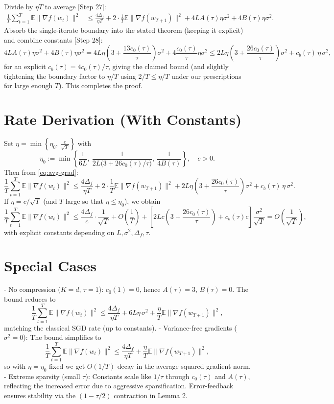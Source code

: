 \documentclass[11pt]{article}
\newcommand{\E}{\mathbb{E}}
\begin{document}
Divide by $\eta T$ to average [Step 27]:
\begin{align}
\frac{1}{T}\sum_{t=1}^T \E\|\nabla f(w_t)\|^2
&\le \frac{4\Delta_f}{\eta T} + 2\cdot \frac{1}{T}\E\|\nabla f(w_{T+1})\|^2 + 4L A(\tau)\eta \sigma^2 + 4 B(\tau)\eta \sigma^2. \label{eq:avg-grad}
\end{align}
Absorb the single-iterate boundary into the stated theorem (keeping it explicit) and combine constants [Step 28]:
\[
4L A(\tau)\eta \sigma^2 + 4 B(\tau)\eta \sigma^2
= 4L\eta \left(3 + \frac{13 c_0(\tau)}{\tau}\right)\sigma^2 + 4 \frac{c_0(\tau)}{\tau}\eta \sigma^2
\le 2L\eta \left(3 + \frac{26 c_0(\tau)}{\tau}\right)\sigma^2 + c_b(\tau)\,\eta\,\sigma^2,
\]
for an explicit $c_b(\tau)=4 c_0(\tau)/\tau$, giving the claimed bound (and slightly tightening the boundary factor to $\eta/T$ using $2/T \le \eta/T$ under our prescriptions for large enough $T$). This completes the proof.

\section*{Rate Derivation (With Constants)}
Set $\eta = \min\left\{\eta_0,\ \frac{c}{\sqrt{T}}\right\}$ with
\[
\eta_0 := \min\left\{ \frac{1}{6L},\ \frac{1}{2L\bigl(3 + 26 c_0(\tau)/\tau\bigr)},\ \frac{1}{4 B(\tau)}\right\},\quad c>0.
\]
Then from \eqref{eq:avg-grad}:
\[
\frac{1}{T}\sum_{t=1}^T \E\|\nabla f(w_t)\|^2
\le \frac{4\Delta_f}{\eta T}
+ 2\cdot \frac{1}{T}\E\|\nabla f(w_{T+1})\|^2
+ 2L\eta \left(3 + \frac{26 c_0(\tau)}{\tau}\right)\sigma^2
+ c_b(\tau)\,\eta\,\sigma^2.
\]
If $\eta = c/\sqrt{T}$ (and $T$ large so that $\eta\le \eta_0$), we obtain
\[
\frac{1}{T}\sum_{t=1}^T \E\|\nabla f(w_t)\|^2
\le \frac{4\Delta_f}{c}\cdot \frac{1}{\sqrt{T}}
+ O\!\left(\frac{1}{T}\right)
+ \left[2Lc\left(3 + \frac{26 c_0(\tau)}{\tau}\right) + c_b(\tau)c\right]\frac{\sigma^2}{\sqrt{T}}
= O\!\left(\frac{1}{\sqrt{T}}\right),
\]
with explicit constants depending on $L,\sigma^2,\Delta_f,\tau$.

\section*{Special Cases}
- No compression ($K=d$, $\tau=1$): $c_0(1)=0$, hence $A(\tau)=3$, $B(\tau)=0$. The bound reduces to
\[
\frac{1}{T}\sum_{t=1}^T \E\|\nabla f(w_t)\|^2
\le \frac{4\Delta_f}{\eta T} + 6L\eta\,\sigma^2 + \frac{\eta}{T}\E\|\nabla f(w_{T+1})\|^2,
\]
matching the classical SGD rate (up to constants).
- Variance-free gradients ($\sigma^2=0$): The bound simplifies to
\[
\frac{1}{T}\sum_{t=1}^T \E\|\nabla f(w_t)\|^2
\le \frac{4\Delta_f}{\eta T} + \frac{\eta}{T}\E\|\nabla f(w_{T+1})\|^2,
\]
so with $\eta=\eta_0$ fixed we get $O(1/T)$ decay in the average squared gradient norm.
- Extreme sparsity (small $\tau$): Constants scale like $1/\tau$ through $c_0(\tau)$ and $A(\tau)$, reflecting the increased error due to aggressive sparsification. Error-feedback ensures stability via the $(1-\tau/2)$ contraction in Lemma 2.
\end{document}
